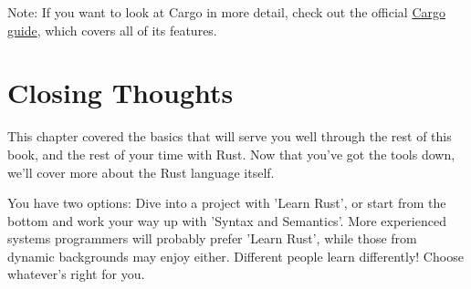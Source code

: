 \begin{myquote}
Note: If you want to look at Cargo in more detail, check out the official \href{http://doc.crates.io/guide.html}{Cargo guide}, 
which covers all of its features.
\end{myquote}

\section{Closing Thoughts}

This chapter covered the basics that will serve you well through the rest of this book, and the rest of your time with Rust. 
Now that you've got the tools down, we'll cover more about the Rust language itself.

\blank

You have two options: Dive into a project with 'Learn Rust', or start from the bottom and work your way up with 
'Syntax and Semantics'. More experienced systems programmers will probably prefer 'Learn Rust', while those from 
dynamic backgrounds may enjoy either. Different people learn differently! Choose whatever's right for you.
